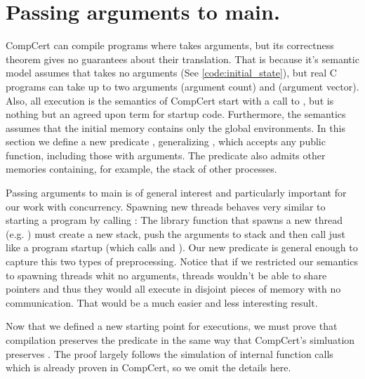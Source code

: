 \section{Passing arguments to main.}\label{sec:premain}

CompCert can compile programs where  takes arguments, but its correctness theorem gives no guarantees about their translation. That is because it's semantic model assumes that  takes no arguments (See \ref{code:initial_state}), but real C programs can take up to two arguments  (argument count) and  (argument vector). Also, all execution is the semantics of CompCert start with a call to , but  is nothing but an agreed upon term for startup code. Furthermore, the semantics assumes that the initial memory contains only the global environments. In this section we define a new predicate , generalizing , which accepts any public function, including those with arguments. The predicate also admits other memories containing, for example, the stack of other processes. 

Passing arguments to main is of general interest and particularly important for our work with concurrency. Spawning new threads behaves very similar to starting a program by calling : The library function that spawns a new thread  (e.g. ) must create a new stack, push the arguments to stack and then call  just like a program startup (which calls  and ). Our new predicate  is general enough to capture this two types of preprocessing.
Notice that if we restricted our semantics to spawning threads whit no arguments, threads wouldn't be able to share pointers and thus they would all execute in disjoint pieces of memory with no communication. That would be a much easier and less interesting result. 

Now that we defined a new starting point for executions, we must prove that compilation preserves the predicate  in the same way that CompCert's simluation preserves . The proof largely follows the simulation of internal function calls which is already proven in CompCert, so we omit the details here. 

